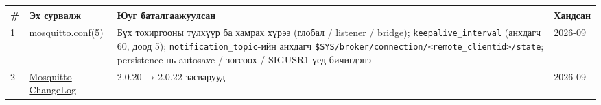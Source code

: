 \begingroup\scriptsize\begin{longtable}[]{@{}llll@{}}
\toprule
\begin{minipage}[b]{0.22\columnwidth}\raggedright
\#\strut
\end{minipage} & \begin{minipage}[b]{0.22\columnwidth}\raggedright
Эх сурвалж\strut
\end{minipage} & \begin{minipage}[b]{0.22\columnwidth}\raggedright
Юуг баталгаажуулсан\strut
\end{minipage} & \begin{minipage}[b]{0.22\columnwidth}\raggedright
Хандсан\strut
\end{minipage}\tabularnewline
\midrule
\endhead
\begin{minipage}[t]{0.22\columnwidth}\raggedright
1\strut
\end{minipage} & \begin{minipage}[t]{0.22\columnwidth}\raggedright
\href{https://mosquitto.org/man/mosquitto-conf-5.html}{mosquitto.conf(5)}\strut
\end{minipage} & \begin{minipage}[t]{0.22\columnwidth}\raggedright
Бүх тохиргооны түлхүүр ба хамрах хүрээ (глобал / listener / bridge); \texttt{keepalive\_\allowbreak{}interval} (анхдагч 60, доод 5); \texttt{notification\_\allowbreak{}topic}-ийн анхдагч \texttt{\$SYS/\allowbreak{}broker/\allowbreak{}connection/\allowbreak{}\textless{}remote\_\allowbreak{}clientid\textgreater{}/\allowbreak{}state}; persistence нь autosave / зогсоох / SIGUSR1 үед бичигдэнэ\strut
\end{minipage} & \begin{minipage}[t]{0.22\columnwidth}\raggedright
2026-09\strut
\end{minipage}\tabularnewline
\begin{minipage}[t]{0.22\columnwidth}\raggedright
2\strut
\end{minipage} & \begin{minipage}[t]{0.22\columnwidth}\raggedright
\href{https://mosquitto.org/ChangeLog.txt}{Mosquitto ChangeLog}\strut
\end{minipage} & \begin{minipage}[t]{0.22\columnwidth}\raggedright
2.0.20 → 2.0.22 засварууд\strut
\end{minipage} & \begin{minipage}[t]{0.22\columnwidth}\raggedright
2026-09\strut
\end{minipage}\tabularnewline

\end{longtable}
